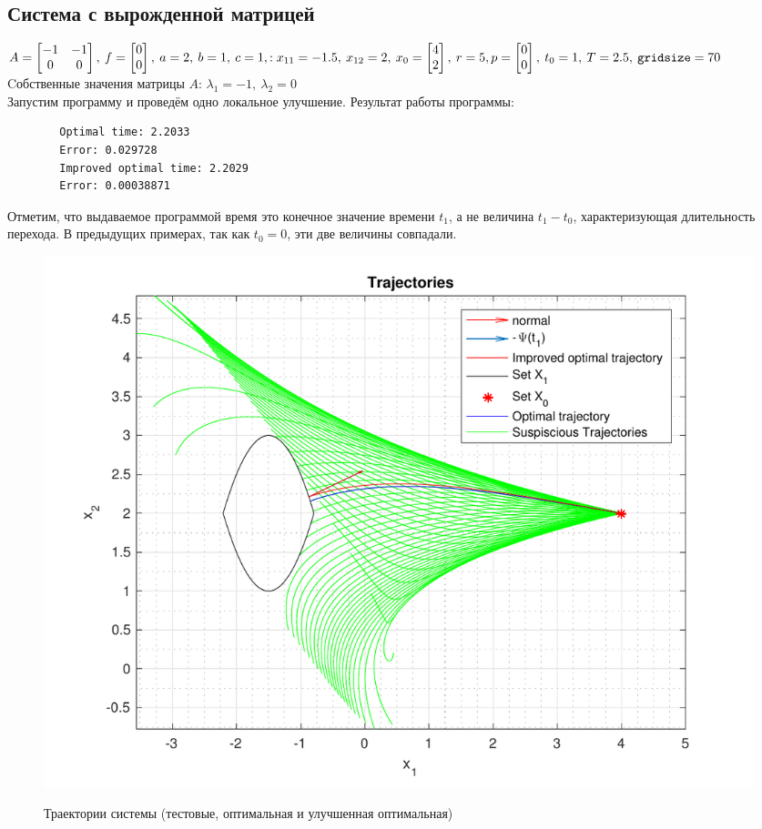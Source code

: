 \documentclass[11pt, oneside, final]{article}
\theoremstyle{break}
\numberwithin{equation}{section}
\theoremstyle{plain}
\theoremstyle{definition}
\begin{document}
    \subsection{Система с вырожденной матрицей}
    \(A = \begin{bmatrix} -1 & -1 \\ 0 & 0 \end{bmatrix},\:f = \begin{bmatrix} 0 \\ 0 \end{bmatrix},\: a = 2,\: b = 1,\: c = 1,: x_{11} = -1.5,\: x_{12} = 2,\: x_0 =  \begin{bmatrix} 4 \\ 2 \end{bmatrix}, \: r = 5, \\ p = \begin{bmatrix} 0 \\ 0 \end{bmatrix}, \: t_0 = 1, \: T = 2.5, \: \mathtt{gridsize} = 70 \)\\
    Cобственные значения матрицы \(A\): \(\lambda_1 = -1, \: \lambda_2 = 0\)\\
    Запустим программу и проведём одно локальное улучшение. Результат работы программы:
    \begin{verbatim}
        Optimal time: 2.2033
        Error: 0.029728
        Improved optimal time: 2.2029
        Error: 0.00038871
    \end{verbatim}
    Отметим, что выдаваемое программой время это конечное значение времени \(t_1\), а не величина \(t_1 - t_0\), характеризующая длительность перехода. В предыдущих примерах, так как \(t_0 = 0\), эти две величины совпадали.
    \begin{figure}[H]
            \centering
            \includegraphics[width=\linewidth]{s4fig1}
            \label{pic:s4:1}
            \caption{Траектории системы (тестовые, оптимальная и улучшенная оптимальная)}
    \end{figure}
\end{document}
